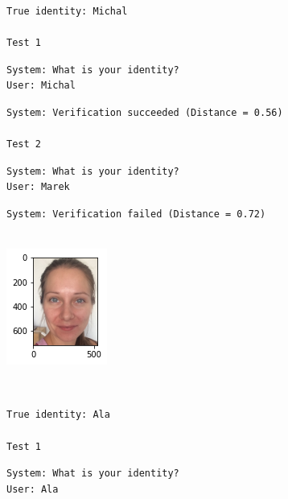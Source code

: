 \documentclass[11pt]{article}
\begin{document}
    \begin{Verbatim}[commandchars=\\\{\}]
True identity: Michal

Test 1
    \end{Verbatim}

    \begin{Verbatim}[commandchars=\\\{\}]
System: What is your identity?
User: Michal
    \end{Verbatim}

    \begin{Verbatim}[commandchars=\\\{\}]
System: Verification succeeded (Distance = 0.56)

Test 2
    \end{Verbatim}

    \begin{Verbatim}[commandchars=\\\{\}]
System: What is your identity?
User: Marek
    \end{Verbatim}

    \begin{Verbatim}[commandchars=\\\{\}]
System: Verification failed (Distance = 0.72)


    \end{Verbatim}

    \begin{center}
    \includegraphics{output_32_24}
    \end{center}
    { \hspace*{\fill} \\}
    
    \begin{Verbatim}[commandchars=\\\{\}]
True identity: Ala

Test 1
    \end{Verbatim}

    \begin{Verbatim}[commandchars=\\\{\}]
System: What is your identity?
User: Ala
    \end{Verbatim}
\end{document}
